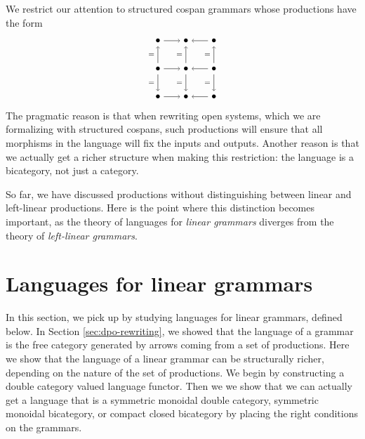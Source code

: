 \documentclass{amsart}
\theoremstyle{remark}
\theoremstyle{definition}
\begin{document}
We restrict our attention to structured cospan grammars whose
productions have the form 
\[
  \begin{tikzpicture}
    \node (1) at (0,2) {\( \bullet \)};
    \node (2) at (1,2) {\( \bullet \)};
    \node (3) at (2,2) {\( \bullet \)};
    \node (4) at (0,1) {\( \bullet \)};
    \node (5) at (1,1) {\( \bullet \)};
    \node (6) at (2,1) {\( \bullet \)};
    \node (7) at (0,0) {\( \bullet \)};
    \node (8) at (1,0) {\( \bullet \)};
    \node (9) at (2,0) {\( \bullet \)};
    \draw [->] (1) to node [] {\scriptsize{\(  \)}} (2);
    \draw [->] (3) to node [] {\scriptsize{\(  \)}} (2);
    \draw [->] (4) to node [] {\scriptsize{\(  \)}} (5);
    \draw [->] (6) to node [] {\scriptsize{\(  \)}} (5);
    \draw [->] (7) to node [] {\scriptsize{\(  \)}} (8);
    \draw [->] (9) to node [] {\scriptsize{\(  \)}} (8);
    \draw [->] (4) to node [left] {\scriptsize{\( =  \)}} (1);
    \draw [->] (4) to node [left] {\scriptsize{\( = \)}} (7);
    \draw [->] (5) to node [left] {\scriptsize{\( =  \)}} (2);
    \draw [->] (5) to node [left] {\scriptsize{\( = \)}} (8);
    \draw [->] (6) to node [left] {\scriptsize{\( = \)}} (3);
    \draw [->] (6) to node [left] {\scriptsize{\( = \)}} (9); 
  \end{tikzpicture}
\]
% 
The pragmatic reason is that when rewriting open systems, which we are
formalizing with structured cospans, such productions will ensure that
all morphisms in the language will fix the inputs and
outputs. Another reason is that we actually get a richer structure
when making this restriction: the language is a bicategory, not just a
category.

So far, we have discussed productions without distinguishing between
linear and left-linear productions.  Here is the point where this
distinction becomes important, as the theory of languages for \emph{
  linear grammars} diverges from the theory of \emph{left-linear
  grammars}.


\section{Languages for linear grammars}
\label{sec:lang-linear-grammars}

In this section, we pick up by studying languages for linear grammars,
defined below. In Section \ref{sec:dpo-rewriting}, we showed that the
language of a grammar is the free category generated by arrows coming
from a set of productions. Here we show that the language of a linear
grammar can be structurally richer, depending on the nature of the set
of productions. We begin by constructing a double category valued
language functor. Then we we show that we can actually get a language
that is a symmetric monoidal double category, symmetric monoidal
bicategory, or compact closed bicategory by placing the right
conditions on the grammars.
\end{document}
